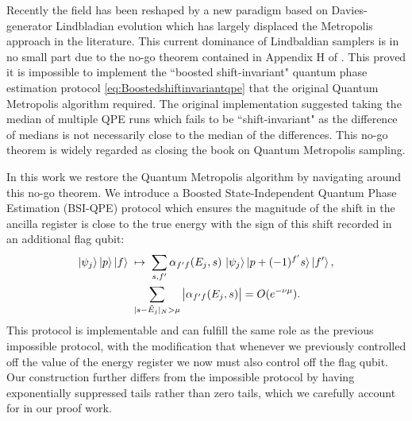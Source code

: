 \documentclass[aps,floatfix,10pt,amssymb,amsfont,amsmath,superscriptaddress,float,nofootinbib,longbibliography,nobalancelastpage,twocolumn]{revtex4-2}
\begin{document}
Recently the field has been reshaped by a new paradigm based on Davies-generator Lindbladian evolution \cite{chen2023quantumthermalstatepreparation,Kastoryano2014QuantumGS,shtanko2021preparing,chen2021fast,chen2023efficient,rall2023thermal,gilyen2024quantum,ding2025efficient,ding2025end,guo2025designing,chen2025efficient, hahn2026efficient, scandi2026thermalization,leng2026accelerating,rouze2026optimal,lloyd2026quantum,Rouz__2026} which has largely displaced the Metropolis approach in the literature. This current dominance of Lindbaldian samplers is in no small part due to the no-go theorem contained in Appendix H of \cite{chen2023quantumthermalstatepreparation}. This proved it is impossible to implement the ``boosted shift-invariant" quantum phase estimation protocol \eqref{eq:Boostedshiftinvariantqpe} that the original Quantum Metropolis algorithm required.  The original implementation \cite{Temme_2011} suggested taking the median of multiple QPE runs which fails to be ``shift-invariant" as the difference of medians is not necessarily close to the median of the differences. This no-go theorem is widely regarded as closing the book on Quantum Metropolis sampling. 

In this work we restore the Quantum Metropolis algorithm by navigating around this no-go theorem. We introduce a Boosted State-Independent Quantum Phase Estimation (BSI-QPE) protocol which ensures the magnitude of the shift in the ancilla register is close to the true energy with the sign of this shift recorded in an additional flag qubit:
\begin{multline}
  \ket{\psi_j}\ket{p}\ket{f} \;\mapsto\; \sum_{s,f'} \alpha_{f'f}(E_j,s)\,
  \ket{\psi_j}\ket{p+(-1)^{f'}s}\ket{f'},\\
  \qquad \sum_{|s-\tilde E_j|_{N} > \mu} \big|\alpha_{f'f}(E_j,s)\big| = O(e^{-\nu\mu}).
\end{multline}
This protocol is implementable and can fulfill the same role as the previous impossible protocol, with the modification that whenever we previously controlled off the value of the energy register we now must also control off the flag qubit. Our construction further differs from the impossible protocol by having exponentially suppressed tails rather than zero tails, which we carefully account for in our proof work.
\end{document}
